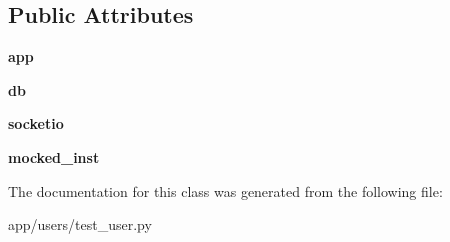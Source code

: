 \subsection*{Public Attributes}
\begin{DoxyCompactItemize}
\item 
\mbox{\label{classapp_1_1users_1_1test__user_1_1_test_user_a6d80ccc083e40ceee83782b951aa45e1}} 
{\bfseries app}
\item 
\mbox{\label{classapp_1_1users_1_1test__user_1_1_test_user_a936c4a99ea5b68ee7134a5e04383d816}} 
{\bfseries db}
\item 
\mbox{\label{classapp_1_1users_1_1test__user_1_1_test_user_a47874024981fa7c97ae26857acba952f}} 
{\bfseries socketio}
\item 
\mbox{\label{classapp_1_1users_1_1test__user_1_1_test_user_a6cfe35395ebc6f97c1b140ed71d55983}} 
{\bfseries mocked\+\_\+inst}
\end{DoxyCompactItemize}


The documentation for this class was generated from the following file\+:\begin{DoxyCompactItemize}
\item 
app/users/test\+\_\+user.\+py\end{DoxyCompactItemize}
